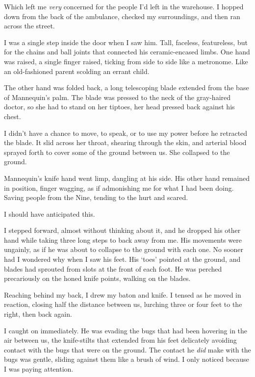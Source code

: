 Which left me \emph{very} concerned for the people I'd left in the warehouse.  I hopped down from the back of the ambulance, checked my surroundings, and then ran across the street.



I was a single step inside the door when I saw him.  Tall, faceless, featureless, but for the chains and ball joints that connected his ceramic-encased limbs.  One hand was raised, a single finger raised, ticking from side to side like a metronome.  Like an old-fashioned parent scolding an errant child.



The other hand was folded back, a long telescoping blade extended from the base of Mannequin's palm.  The blade was pressed to the neck of the gray-haired doctor, so she had to stand on her tiptoes, her head pressed back against his chest.



I didn't have a chance to move, to speak, or to use my power before he retracted the blade.  It slid across her throat, shearing through the skin, and arterial blood sprayed forth to cover some of the ground between us.  She collapsed to the ground.



Mannequin's knife hand went limp, dangling at his side.  His other hand remained in position, finger wagging, as if admonishing me for what I had been doing.  Saving people from the Nine, tending to the hurt and scared.



I should have anticipated this.



I stepped forward, almost without thinking about it, and he dropped his other hand while taking three long steps to back away from me. His movements were ungainly, as if he was about to collapse to the ground with each one.  No sooner had I wondered why when I saw his feet.  His `toes' pointed at the ground, and blades had sprouted from slots at the front of each foot.  He was perched precariously on the honed knife points, walking on the blades.



Reaching behind my back, I drew my baton and knife.  I tensed as he moved in reaction, closing half the distance between us, lurching three or four feet to the right, then back again.



I caught on immediately.  He was evading the bugs that had been hovering in the air between us, the knife-stilts that extended from his feet delicately avoiding contact with the bugs that were on the ground.  The contact he \emph{did} make with the bugs was gentle, sliding against them like a brush of wind.  I only noticed because I was paying attention.



